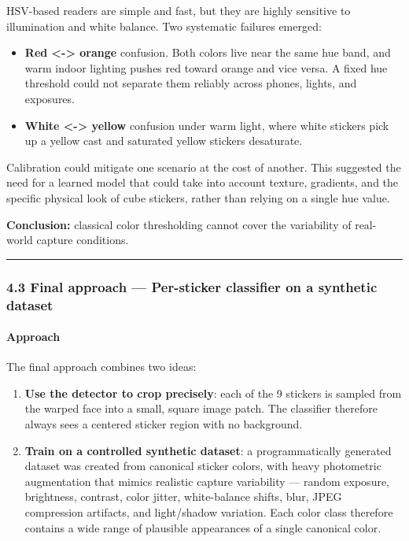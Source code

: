 \documentclass[
  11pt,
  a4paper,
]{article}
\providecommand{\tightlist}{%
  \setlength{\itemsep}{0pt}\setlength{\parskip}{0pt}}
\begin{document}
HSV-based readers are simple and fast, but they are highly sensitive to
illumination and white balance. Two systematic failures emerged:

\begin{itemize}
\tightlist
\item
  \textbf{Red \textless-\textgreater{} orange} confusion. Both colors
  live near the same hue band, and warm indoor lighting pushes red
  toward orange and vice versa. A fixed hue threshold could not separate
  them reliably across phones, lights, and exposures.
\item
  \textbf{White \textless-\textgreater{} yellow} confusion under warm
  light, where white stickers pick up a yellow cast and saturated yellow
  stickers desaturate.
\end{itemize}

Calibration could mitigate one scenario at the cost of another. This
suggested the need for a learned model that could take into account
texture, gradients, and the specific physical look of cube stickers,
rather than relying on a single hue value.

\textbf{Conclusion:} classical color thresholding cannot cover the
variability of real-world capture conditions.

\begin{center}\rule{0.5\linewidth}{0.5pt}\end{center}

\subsubsection{4.3 Final approach --- Per-sticker classifier on a
synthetic
dataset}\label{final-approach-per-sticker-classifier-on-a-synthetic-dataset}

\paragraph{Approach}\label{approach-3}

The final approach combines two ideas:

\begin{enumerate}
\def\labelenumi{\arabic{enumi}.}
\item
  \textbf{Use the detector to crop precisely}: each of the 9 stickers is
  sampled from the warped face into a small, square image patch. The
  classifier therefore always sees a centered sticker region with no
  background.
\item
  \textbf{Train on a controlled synthetic dataset}: a programmatically
  generated dataset was created from canonical sticker colors, with
  heavy photometric augmentation that mimics realistic capture
  variability --- random exposure, brightness, contrast, color jitter,
  white-balance shifts, blur, JPEG compression artifacts, and
  light/shadow variation. Each color class therefore contains a wide
  range of plausible appearances of a single canonical color.
\end{enumerate}
\end{document}
